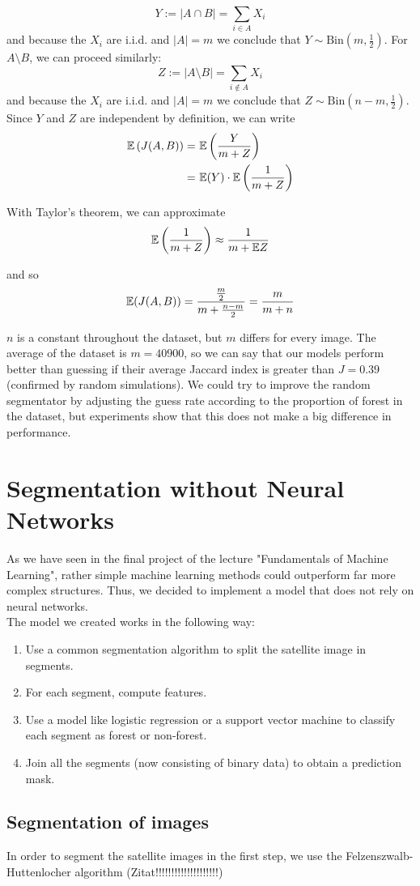 \begin{equation}
  Y:= |A \cap B| = \sum_{i \in A} X_i
\end{equation}
and because the $X_i$ are i.i.d. and $|A|=m$ we conclude that $Y\sim \text{Bin}(m, \frac{1}{2})$. For $A\setminus B$, we can proceed similarly:
\begin{equation}
  Z:= |A\setminus B| = \sum_{i \notin A} X_i
\end{equation}
and because the $X_i$ are i.i.d. and $|A|=m$ we conclude that $Z\sim \text{Bin}\left (n-m, \frac{1}{2} \right)$. Since $Y$ and $Z$ are independent by definition, we can write
\begin{align*}
  \mathbb{E}\left(J(A,B)\right) = \ & \mathbb{E} \left(\frac{Y}{m+Z} \right) \\
   = \ & \mathbb{E}(Y) \cdot \mathbb{E} \left(\frac{1}{m+Z} \right)
\end{align*}

With Taylor's theorem, we can approximate
\begin{equation}
  \mathbb{E} \left(\frac{1}{m+Z}\right) \approx \frac{1}{m+\mathbb{E} Z}
\end{equation}

and so
\begin{equation}
  \mathbb{E}(J(A,B)) = \frac{\frac{m}{2}}{m + \frac{n-m}{2}} = \frac{m}{m+n}
\end{equation}

$n$ is a constant throughout the dataset, but $m$ differs for every image. The average of the dataset is $m=40900$, so we can say that our models perform better than guessing if their average Jaccard index is greater than $J = 0.39$ (confirmed by random simulations). We could try to improve the random segmentator by adjusting the guess rate according to the proportion of forest in the dataset, but experiments show that this does not make a big difference in performance.

\section{Segmentation without Neural Networks}
As we have seen in the final project of the lecture "Fundamentals of Machine Learning", rather simple machine learning methods could outperform far more complex structures. Thus, we decided to implement a model that does not rely on neural networks. \\
The model we created works in the following way:
\begin{enumerate}
	\item Use a common segmentation algorithm to split the satellite image in segments.
	\item For each segment, compute features.
	\item Use a model like logistic regression or a support vector machine to classify each segment as forest or non-forest.
	\item Join all the segments (now consisting of binary data) to obtain a prediction mask.
\end{enumerate}

\subsection{Segmentation of images}
In order to segment the satellite images in the first step, we use the Felzenszwalb-Huttenlocher algorithm (Zitat!!!!!!!!!!!!!!!!!!!!)
